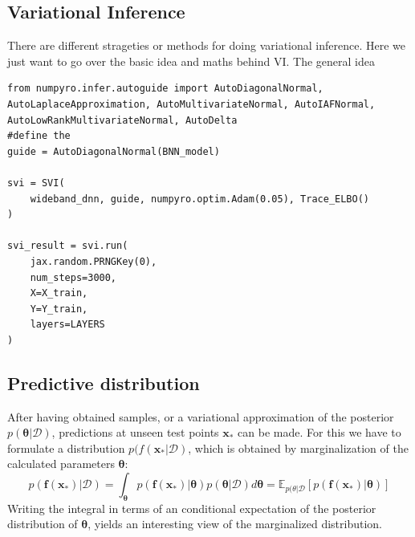 \documentclass{article}
\begin{document}
\subsection{Variational Inference}
There are different strageties or methods for doing variational inference. Here we just want to go over the basic idea and maths behind VI. The general idea 
\begin{lstlisting}
from numpyro.infer.autoguide import AutoDiagonalNormal, AutoLaplaceApproximation, AutoMultivariateNormal, AutoIAFNormal, AutoLowRankMultivariateNormal, AutoDelta
#define the 
guide = AutoDiagonalNormal(BNN_model)

svi = SVI(
    wideband_dnn, guide, numpyro.optim.Adam(0.05), Trace_ELBO()
)

svi_result = svi.run(
    jax.random.PRNGKey(0),
    num_steps=3000,
    X=X_train,
    Y=Y_train,
    layers=LAYERS
)
\end{lstlisting}
\subsection{Predictive distribution}
After having obtained samples, or a variational approximation of the posterior $p(\bm \theta|\mathcal{D})$, predictions at unseen test points $\bm x_*$ can be made. For this we have to formulate a distribution $p(f(\bm x_*|\mathcal{D})$, which is obtained by marginalization of the calculated parameters $\bm \theta$:
\begin{equation}
    p(\bm f( \bm x_*) |\mathcal{D}) = \int_{\bm \theta} p(\bm f ({\bm x_*})|\bm \theta ) p(\bm \theta | \mathcal{D})d \bm \theta = \mathbb{E}_{p(\theta|\mathcal{D}} \left[ p(\bm f ({\bm x_*})|\bm \theta )\right]
\end{equation}
Writing the integral in terms of an conditional expectation of the posterior distribution of $\bm \theta$, yields an interesting view of the marginalized distribution. 
\end{document}

